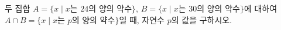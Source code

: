 두 집합 $A=\{x \mid x$는 $24$의 양의 약수$\}$, $B=\{x \mid x$는 $30$의 양의 약수$\}$에 대하여 $A\cap B=\{x \mid x$는 $p$의 양의 약수$\}$일 때, 자연수 $p$의 값을 구하시오.
